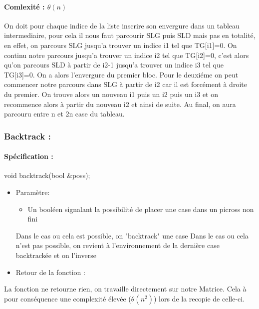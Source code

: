 \documentclass{article}
\begin{document}
\paragraph{Comlexité : $\theta(n)$\newline}
On doit pour chaque indice de la liste inscrire son envergure dans un tableau intermediaire, pour cela il nous faut parcourir SLG puis SLD mais pas en totalité, en effet, on parcours SLG jusqu'a trouver un indice i1 tel que TG[i1]=0.
On continu notre parcours jusqu'a trouver un indice i2 tel que TG[i2]=0, c'est alors qu'on parcours SLD à partir de i2-1 jusqu'a trouver un indice i3 tel que TG[i3]=0. 
On a alors l'envergure du premier bloc. Pour le deuxiéme on peut commencer notre parcours dans SLG à partir de i2 car il est forcément à droite du premier.\newline 
On trouve alors un nouveau i1 puis un i2 puis un i3 et on recommence alors à partir du nouveau i2 et ainsi de suite. Au final, on aura parcouru entre n et 2n case du tableau.
\subsubsection{Backtrack :}
\paragraph{Spécification :}
 void backtrack(bool \&poss);
\begin{itemize}
\item Param\`etre:
\begin{itemize}
\item Un booléen signalant la possibilité de placer une case dans un picross non fini
\end{itemize}
Dans le cas ou cela est possible, on "backtrack" une case
Dans le cas ou cela n'est pas possible, on revient à l'environnement de la dernière case backtrackée et on l'inverse
\item Retour de la fonction :
\end{itemize}
La fonction ne retourne rien, on travaille directement sur notre Matrice.\newline
Cela à pour conséquence une complexité élevée ($\theta(n^2)$) lors de la recopie de celle-ci.
\end{document}
